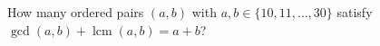 How many ordered pairs $(a,b)$ with $a,b\in\{10,11,\ldots,30\}$ satisfy $\gcd(a,b)+\operatorname{lcm}(a,b)=a+b$?
